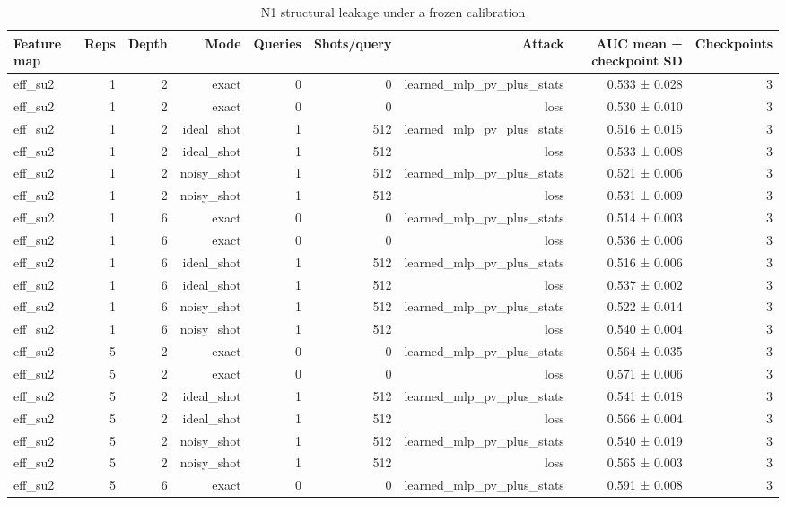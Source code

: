 \begin{table}
\caption{N1 structural leakage under a frozen calibration}
\label{tab:satml_noise_n1_cells}
\begin{tabular}{lrrrrrrrr}
\toprule
Feature map & Reps & Depth & Mode & Queries & Shots/query & Attack & AUC mean ± checkpoint SD & Checkpoints \\
\midrule
eff\_su2 & 1 & 2 & exact & 0 & 0 & learned\_mlp\_pv\_plus\_stats & 0.533 ± 0.028 & 3 \\
eff\_su2 & 1 & 2 & exact & 0 & 0 & loss & 0.530 ± 0.010 & 3 \\
eff\_su2 & 1 & 2 & ideal\_shot & 1 & 512 & learned\_mlp\_pv\_plus\_stats & 0.516 ± 0.015 & 3 \\
eff\_su2 & 1 & 2 & ideal\_shot & 1 & 512 & loss & 0.533 ± 0.008 & 3 \\
eff\_su2 & 1 & 2 & noisy\_shot & 1 & 512 & learned\_mlp\_pv\_plus\_stats & 0.521 ± 0.006 & 3 \\
eff\_su2 & 1 & 2 & noisy\_shot & 1 & 512 & loss & 0.531 ± 0.009 & 3 \\
eff\_su2 & 1 & 6 & exact & 0 & 0 & learned\_mlp\_pv\_plus\_stats & 0.514 ± 0.003 & 3 \\
eff\_su2 & 1 & 6 & exact & 0 & 0 & loss & 0.536 ± 0.006 & 3 \\
eff\_su2 & 1 & 6 & ideal\_shot & 1 & 512 & learned\_mlp\_pv\_plus\_stats & 0.516 ± 0.006 & 3 \\
eff\_su2 & 1 & 6 & ideal\_shot & 1 & 512 & loss & 0.537 ± 0.002 & 3 \\
eff\_su2 & 1 & 6 & noisy\_shot & 1 & 512 & learned\_mlp\_pv\_plus\_stats & 0.522 ± 0.014 & 3 \\
eff\_su2 & 1 & 6 & noisy\_shot & 1 & 512 & loss & 0.540 ± 0.004 & 3 \\
eff\_su2 & 5 & 2 & exact & 0 & 0 & learned\_mlp\_pv\_plus\_stats & 0.564 ± 0.035 & 3 \\
eff\_su2 & 5 & 2 & exact & 0 & 0 & loss & 0.571 ± 0.006 & 3 \\
eff\_su2 & 5 & 2 & ideal\_shot & 1 & 512 & learned\_mlp\_pv\_plus\_stats & 0.541 ± 0.018 & 3 \\
eff\_su2 & 5 & 2 & ideal\_shot & 1 & 512 & loss & 0.566 ± 0.004 & 3 \\
eff\_su2 & 5 & 2 & noisy\_shot & 1 & 512 & learned\_mlp\_pv\_plus\_stats & 0.540 ± 0.019 & 3 \\
eff\_su2 & 5 & 2 & noisy\_shot & 1 & 512 & loss & 0.565 ± 0.003 & 3 \\
eff\_su2 & 5 & 6 & exact & 0 & 0 & learned\_mlp\_pv\_plus\_stats & 0.591 ± 0.008 & 3 \\

\end{tabular}
\end{table}
